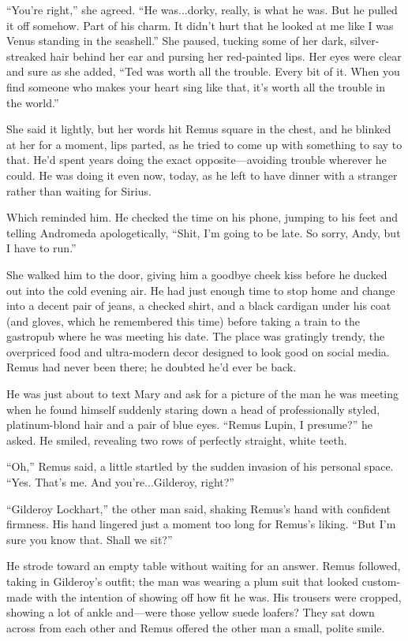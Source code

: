 “You’re right,” she agreed. “He was...dorky, really, is what he was. But he pulled it off somehow. Part of his charm. It didn’t hurt that he looked at me like I was Venus standing in the seashell.” She paused, tucking some of her dark, silver-streaked hair behind her ear and pursing her red-painted lips. Her eyes were clear and sure as she added, “Ted was worth all the trouble. Every bit of it. When you find someone who makes your heart sing like that, it’s worth all the trouble in the world.”

She said it lightly, but her words hit Remus square in the chest, and he blinked at her for a moment, lips parted, as he tried to come up with something to say to that. He’d spent years doing the exact opposite—avoiding trouble wherever he could. He was doing it even now, today, as he left to have dinner with a stranger rather than waiting for Sirius.

Which reminded him. He checked the time on his phone, jumping to his feet and telling Andromeda apologetically, “Shit, I’m going to be late. So sorry, Andy, but I have to run.”

She walked him to the door, giving him a goodbye cheek kiss before he ducked out into the cold evening air. He had just enough time to stop home and change into a decent pair of jeans, a checked shirt, and a black cardigan under his coat (and gloves, which he remembered this time) before taking a train to the gastropub where he was meeting his date. The place was gratingly trendy, the overpriced food and ultra-modern decor designed to look good on social media. Remus had never been there; he doubted he’d ever be back.

He was just about to text Mary and ask for a picture of the man he was meeting when he found himself suddenly staring down a head of professionally styled, platinum-blond hair and a pair of blue eyes. “Remus Lupin, I presume?” he asked. He smiled, revealing two rows of perfectly straight, white teeth.

“Oh,” Remus said, a little startled by the sudden invasion of his personal space. “Yes. That’s me. And you’re...Gilderoy, right?”

“Gilderoy Lockhart,” the other man said, shaking Remus’s hand with confident firmness. His hand lingered just a moment too long for Remus’s liking. “But I’m sure you know that. Shall we sit?”

He strode toward an empty table without waiting for an answer. Remus followed, taking in Gilderoy’s outfit; the man was wearing a plum suit that looked custom-made with the intention of showing off how fit he was. His trousers were cropped, showing a lot of ankle and—were those yellow suede loafers? They sat down across from each other and Remus offered the other man a small, polite smile.

